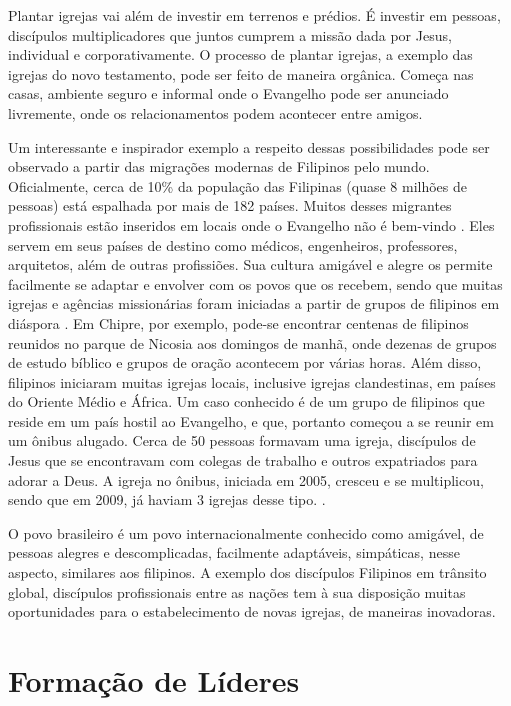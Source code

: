 \documentclass[12pt,openright,oneside,a4paper]{abntex2}
\begin{document}
Plantar igrejas vai além de investir em terrenos e prédios. É investir em pessoas, discípulos multiplicadores que juntos cumprem a missão dada por Jesus, individual e corporativamente. O processo de plantar igrejas, a exemplo das igrejas do novo testamento, pode ser feito de maneira orgânica. Começa nas casas, ambiente seguro e informal onde o Evangelho pode ser anunciado livremente, onde os relacionamentos podem acontecer entre amigos.

Um interessante e inspirador exemplo a respeito dessas possibilidades pode ser observado a partir das migrações modernas de Filipinos pelo mundo. Oficialmente, cerca de 10\% da população das Filipinas (quase 8 milhões de pessoas) está espalhada por mais de 182 países. Muitos desses migrantes profissionais estão inseridos em locais onde o Evangelho não é bem-vindo \cite[p. 3]{wan2009filipino}. Eles servem em seus países de destino como médicos, engenheiros, professores, arquitetos, além de outras profissiões. Sua cultura amigável e alegre os permite facilmente se adaptar e envolver com os povos que os recebem, sendo que muitas igrejas e agências missionárias foram iniciadas a partir de grupos de filipinos em diáspora \cite[5,6]{wan2009filipino}. Em Chipre, por exemplo, pode-se encontrar centenas de filipinos reunidos no parque de Nicosia aos domingos de manhã, onde dezenas de grupos de estudo bíblico e grupos de oração acontecem por várias horas. Além disso, filipinos iniciaram muitas igrejas locais, inclusive igrejas clandestinas, em países do Oriente Médio e África. Um caso conhecido é de um grupo de filipinos que reside em um país hostil ao Evangelho, e que, portanto começou a se reunir em um ônibus alugado. Cerca de 50 pessoas formavam uma igreja, discípulos de Jesus que se encontravam com colegas de trabalho e outros expatriados para adorar a Deus. A igreja no ônibus, iniciada em 2005, cresceu e se multiplicou, sendo que em 2009, já haviam 3 igrejas desse tipo. \cite[8]{wan2009filipino}.

O povo brasileiro é um povo internacionalmente conhecido como amigável, de pessoas alegres e descomplicadas, facilmente adaptáveis, simpáticas, nesse aspecto, similares aos filipinos. A exemplo dos discípulos Filipinos em trânsito global, discípulos profissionais entre as nações tem à sua disposição muitas oportunidades para o estabelecimento de novas igrejas, de maneiras inovadoras. 

\section{Formação de Líderes}
\end{document}
